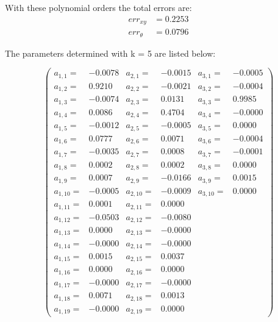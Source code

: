 \documentclass[conference]{IEEEtran}
\begin{document}
\begin{compactenum}[a)]
With these polynomial orders the total errors are:
\begin{align}
	err_{xy} & = 0.2253\\
	err_{\theta} & = 0.0796
\end{align}

The parameters determined with k = 5 are listed below:

$$
\left(
\scriptscriptstyle{
\begin{smallmatrix}
a_{1,1} =&   -0.0078&	a_{2,1} =&   -0.0015&	a_{3,1} =&  -0.0005 \\
a_{1,2} =&    0.9210&	a_{2,2} =&   -0.0021&	a_{3,2} =&	-0.0004	\\
a_{1,3} =&   -0.0074& 	a_{2,3} =&    0.0131&	a_{3,3} =&	 0.9985	\\
a_{1,4} =&    0.0086&	a_{2,4} =&    0.4704&	a_{3,4} =&	-0.0000	\\
a_{1,5} =&   -0.0012&	a_{2,5} =&   -0.0005&	a_{3,5} =&	 0.0000	\\
a_{1,6} =&    0.0777&	a_{2,6} =&    0.0071&	a_{3,6} =&	-0.0004	\\
a_{1,7} =&   -0.0035&	a_{2,7} =&    0.0008&	a_{3,7} =&	-0.0001	\\
a_{1,8} =&    0.0002&	a_{2,8} =&    0.0002&	a_{3,8} =&	 0.0000	\\
a_{1,9} =&    0.0007&	a_{2,9} =&   -0.0166&	a_{3,9} =&	 0.0015	\\
a_{1,10} =&   -0.0005&	a_{2,10} =&   -0.0009&	a_{3,10} =&	 0.0000	\\
a_{1,11} =&    0.0001&	a_{2,11} =&    0.0000	\\
a_{1,12} =&   -0.0503&	a_{2,12} =&   -0.0080	\\
a_{1,13} =&    0.0000&	a_{2,13} =&   -0.0000	\\
a_{1,14} =&   -0.0000&	a_{2,14} =&   -0.0000	\\
a_{1,15} =&    0.0015&	a_{2,15} =&    0.0037	\\
a_{1,16} =&    0.0000&	a_{2,16} =&    0.0000	\\
a_{1,17} =&   -0.0000&	a_{2,17} =&   -0.0000	\\
a_{1,18} =&    0.0071&	a_{2,18} =&    0.0013	\\
a_{1,19} =&   -0.0000&	a_{2,19} =&    0.0000	
\end{smallmatrix}}
\right)
$$



\end{compactenum}
\end{document}
